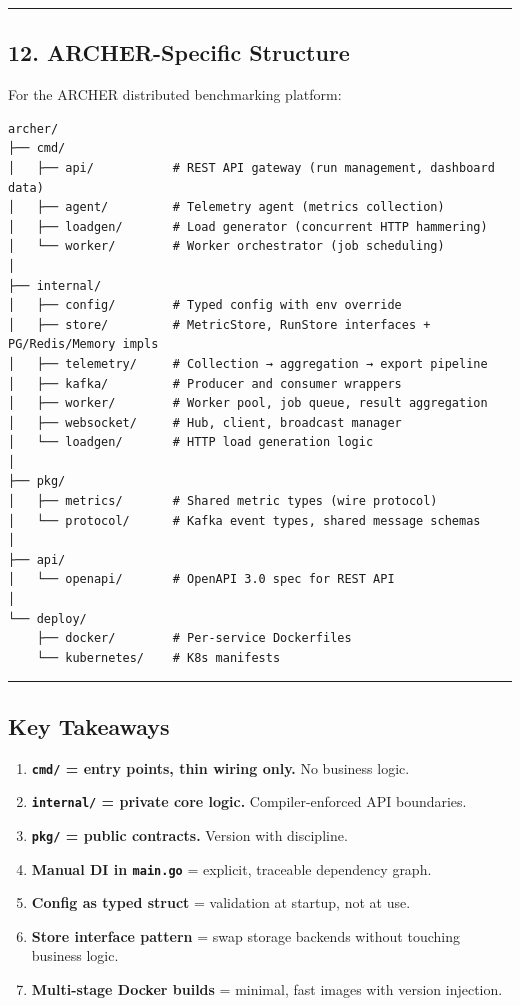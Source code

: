 \documentclass[11pt,openany]{book}
\providecommand{\tightlist}{%
  \setlength{\itemsep}{0pt}\setlength{\parskip}{0pt}}
\begin{document}
\begin{center}\rule{0.5\linewidth}{0.5pt}\end{center}

\hypertarget{archer-specific-structure}{%
\subsection{12. ARCHER-Specific
Structure}\label{archer-specific-structure}}

For the ARCHER distributed benchmarking platform:

\begin{verbatim}
archer/
├── cmd/
│   ├── api/           # REST API gateway (run management, dashboard data)
│   ├── agent/         # Telemetry agent (metrics collection)
│   ├── loadgen/       # Load generator (concurrent HTTP hammering)
│   └── worker/        # Worker orchestrator (job scheduling)
│
├── internal/
│   ├── config/        # Typed config with env override
│   ├── store/         # MetricStore, RunStore interfaces + PG/Redis/Memory impls
│   ├── telemetry/     # Collection → aggregation → export pipeline
│   ├── kafka/         # Producer and consumer wrappers
│   ├── worker/        # Worker pool, job queue, result aggregation
│   ├── websocket/     # Hub, client, broadcast manager
│   └── loadgen/       # HTTP load generation logic
│
├── pkg/
│   ├── metrics/       # Shared metric types (wire protocol)
│   └── protocol/      # Kafka event types, shared message schemas
│
├── api/
│   └── openapi/       # OpenAPI 3.0 spec for REST API
│
└── deploy/
    ├── docker/        # Per-service Dockerfiles
    └── kubernetes/    # K8s manifests
\end{verbatim}

\begin{center}\rule{0.5\linewidth}{0.5pt}\end{center}

\hypertarget{key-takeaways-1}{%
\subsection{Key Takeaways}\label{key-takeaways-1}}

\begin{enumerate}
\def\labelenumi{\arabic{enumi}.}
\tightlist
\item
  \textbf{\texttt{cmd/} = entry points, thin wiring only.} No business
  logic.
\item
  \textbf{\texttt{internal/} = private core logic.} Compiler-enforced
  API boundaries.
\item
  \textbf{\texttt{pkg/} = public contracts.} Version with discipline.
\item
  \textbf{Manual DI in \texttt{main.go}} = explicit, traceable
  dependency graph.
\item
  \textbf{Config as typed struct} = validation at startup, not at use.
\item
  \textbf{Store interface pattern} = swap storage backends without
  touching business logic.
\item
  \textbf{Multi-stage Docker builds} = minimal, fast images with version
  injection.
\end{enumerate}
\end{document}
